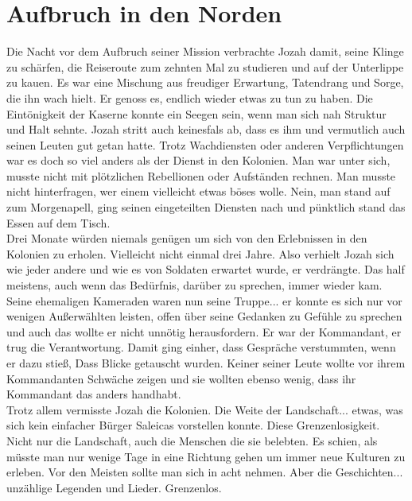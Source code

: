 \chapter{Aufbruch in den Norden}

Die Nacht vor dem Aufbruch seiner Mission verbrachte Jozah damit, seine Klinge zu schärfen, die 
Reiseroute zum zehnten Mal zu studieren und auf der Unterlippe zu kauen. Es war eine Mischung aus 
freudiger Erwartung, Tatendrang und Sorge, die ihn wach hielt. Er genoss es, endlich wieder etwas zu 
tun zu haben. Die Eintönigkeit der Kaserne konnte ein Seegen sein, wenn man sich nah Struktur und 
Halt sehnte. Jozah stritt auch keinesfals ab, dass es ihm und vermutlich auch seinen Leuten gut 
getan hatte. Trotz Wachdiensten oder anderen Verpflichtungen war es doch so viel anders als der 
Dienst in den Kolonien. Man war unter sich, musste nicht mit plötzlichen Rebellionen oder 
Aufständen rechnen. Man musste nicht hinterfragen, wer einem vielleicht etwas böses wolle. Nein, 
man stand auf zum Morgenapell, ging seinen eingeteilten Diensten nach und pünktlich stand das Essen 
auf dem Tisch. \\
Drei Monate würden niemals genügen um sich von den Erlebnissen in den Kolonien zu erholen. 
Vielleicht nicht einmal drei Jahre. Also verhielt Jozah sich wie jeder andere und wie es von 
Soldaten erwartet wurde, er verdrängte. Das half meistens, auch wenn das Bedürfnis, darüber zu 
sprechen, immer wieder kam. Seine ehemaligen Kameraden waren nun seine Truppe... er konnte es sich 
nur vor wenigen Außerwählten leisten, offen über seine Gedanken zu Gefühle zu sprechen und auch das 
wollte er nicht unnötig herausfordern. Er war der Kommandant, er trug die Verantwortung. Damit ging 
einher, dass Gespräche verstummten, wenn er dazu stieß, Dass Blicke getauscht wurden. Keiner seiner 
Leute wollte vor ihrem Kommandanten Schwäche zeigen und sie wollten ebenso wenig, dass ihr 
Kommandant das anders handhabt. \\
Trotz allem vermisste Jozah die Kolonien. Die Weite der Landschaft... etwas, was sich kein 
einfacher Bürger Saleicas vorstellen konnte. Diese Grenzenlosigkeit. Nicht nur die Landschaft, auch 
die Menschen die sie belebten. Es schien, als müsste man nur wenige Tage in eine Richtung gehen um 
immer neue Kulturen zu erleben. Vor den Meisten sollte man sich in acht nehmen. Aber die 
Geschichten... unzählige Legenden und Lieder. Grenzenlos.\\

